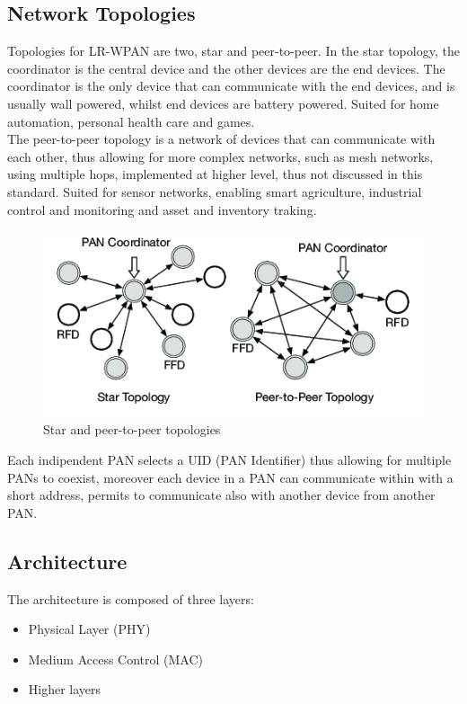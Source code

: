 \documentclass[conference]{IEEEtran}
\begin{document}
\subsection{Network Topologies}
Topologies for LR-WPAN are two, star and peer-to-peer.
In the star topology, the coordinator is the central device and the other devices are the
end devices. The coordinator is the only device that can communicate with the end devices,
and is usually wall powered, whilst end devices are battery powered.
Suited for home automation, personal health care and games.\\
The peer-to-peer topology is a network of devices that can communicate with each other,
thus allowing for more complex networks, such as mesh networks, using multiple hops, 
implemented at higher level, thus not discussed in this standard.
Suited for sensor networks, enabling smart agriculture, industrial control 
and monitoring and asset and inventory traking.
\begin{figure}[!h]
    \centering
    \includegraphics[width=1\linewidth]{topologies}
    \caption{Star and peer-to-peer topologies}
    \label{fig:topologies}
\end{figure}

Each indipendent PAN selects a UID (PAN Identifier) thus allowing for multiple PANs to coexist,
moreover each device in a PAN can communicate within with a short address, permits to
communicate also with another device from another PAN.\\

\subsection{Architecture}
The architecture is composed of three layers:
\begin{itemize}
    \item Physical Layer (PHY)
    \item Medium Access Control (MAC)
    \item Higher layers
\end{itemize}
\end{document}
